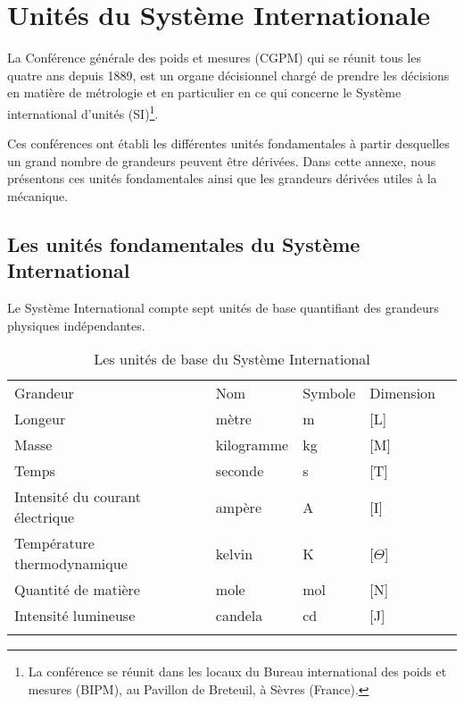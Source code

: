 \chapter{Unités du Système Internationale\label{annexe-usi}}

La Conférence générale des poids et mesures (CGPM) 
qui se réunit tous les quatre ans depuis 1889, est un organe décisionnel chargé de prendre 
les décisions en matière de métrologie et en particulier en ce 
qui concerne le Système international d'unités (SI)\footnote{La conférence se réunit 
dans les locaux du Bureau international des poids et mesures (BIPM), au Pavillon de Breteuil, 
à Sèvres (France).}.

Ces conférences ont établi les différentes unités fondamentales 
à partir desquelles un grand nombre de grandeurs peuvent être dérivées. 
Dans cette annexe, nous présentons ces unités fondamentales ainsi que les grandeurs dérivées utiles à la mécanique.

\section*{Les unités fondamentales du Système International}
Le Système International compte sept unités de base quantifiant des grandeurs physiques indépendantes.

\begin{table}[!h]
    \centering
    \begin{tabular*}{15cm}{M{6cm}M{2.5cm}M{2.5cm}M{2.5cm}N}
        \hhline{====}
        Grandeur & Nom & Symbole & Dimension \\
        \hhline{----}
        Longeur & mètre & \si{\meter} & [L] \\
        Masse & kilogramme & \si{\kilogram} & [M] \\
        Temps & seconde & \si{\second} & [T] \\
        Intensité du courant électrique & ampère & \si{\ampere} & [I] \\
        Température thermodynamique & kelvin & \si{\kelvin} & [$\Theta$] \\
        Quantité de matière & mole & \si{\mole} & [N] \\
        Intensité lumineuse & candela & \si{\candela} & [J] \\
        \hhline{====}
    \end{tabular*}
    \caption{Les unités de base du Système International}
\end{table}

